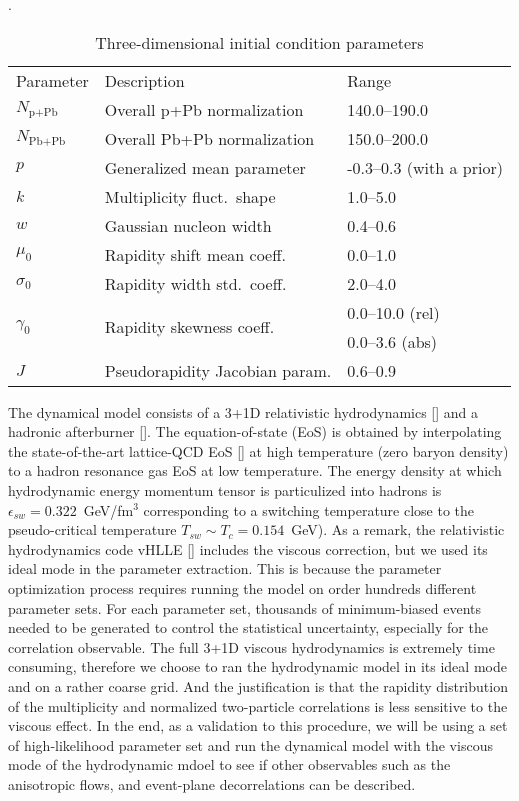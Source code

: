\begin{table}
\centering
\caption{Three-dimensional initial condition parameters}
\label{tab:trento:parameters}.
\begin{tabular}{lll}
      Parameter & Description	& Range \\
      \paddedhline
      $N_{\textrm{p+Pb}}$    & Overall p+Pb normalization      & 140.0--190.0 \\
      $N_{\textrm{Pb+Pb}}$   & Overall Pb+Pb normalization     & 150.0--200.0  \\
      $p$	                   & Generalized mean parameter      & -0.3--0.3 (with a prior)  \\
      $k$	                   & Multiplicity fluct.\ shape      & 1.0--5.0  \\
      $w$	                   & Gaussian nucleon width     & 0.4--0.6  \\
      $\mu_0$                & Rapidity shift mean coeff.\     & 0.0--1.0  \\
      $\sigma_0$             & Rapidity width std.\ coeff.\    & 2.0--4.0  \\
      \multirow{2}{*}{$\gamma_0$}             & \multirow{2}{*}{Rapidity skewness coeff.\ }      & 0.0--10.0 (rel) \\
                  &        & 0.0--3.6 (abs)  \\
      $J$	                   & Pseudorapidity Jacobian param.  & 0.6--0.9
\end{tabular}  
\end{table}

The dynamical model consists of a 3+1D relativistic hydrodynamics [] and a hadronic afterburner [].
The equation-of-state (EoS) is obtained by interpolating the state-of-the-art lattice-QCD EoS [] at high temperature (zero baryon density) to a hadron resonance gas EoS at low temperature.
The energy density at which hydrodynamic energy momentum tensor is particulized into hadrons is $\epsilon_{sw} = 0.322$~GeV/fm$^3$ corresponding to a switching temperature close to the pseudo-critical temperature $T_{sw} \sim T_c = 0.154$~GeV).
As a remark, the relativistic hydrodynamics code \mbox{vHLLE} [] includes the viscous correction, but we used its ideal mode in the parameter extraction.
This is because the parameter optimization process requires running the model on order hundreds different parameter sets.
For each parameter set, thousands of minimum-biased events needed to be generated to control the statistical uncertainty, especially for the correlation observable. 
The full 3+1D viscous hydrodynamics is extremely time consuming, therefore we choose to ran the hydrodynamic model in its ideal mode and on a rather coarse grid.
And the justification is that the rapidity distribution of the multiplicity and normalized two-particle correlations is less sensitive to the viscous effect.
In the end, as a validation to this procedure, we will be using a set of high-likelihood parameter set and run the dynamical model with the viscous mode of the hydrodynamic mdoel to see if other observables such as the anisotropic flows, and event-plane decorrelations can be described.

